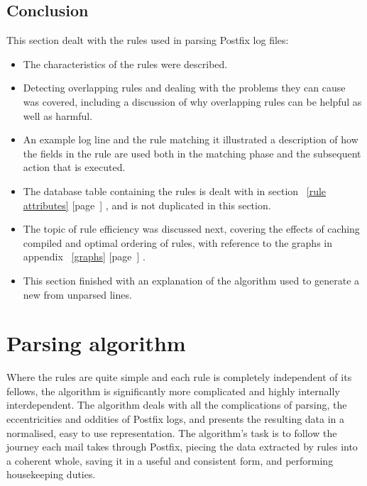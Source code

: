 \documentclass[a4paper,12pt,draft]{article}
\newcommand{\refwithpage}[1]{%
    \empty{}\ref{#1} [page~\pageref{#1}]%
}
\begin{document}
\subsection{Conclusion}

This section dealt with the rules used in parsing Postfix log files:

\begin{itemize}

    \item The characteristics of the rules were described.

    \item Detecting overlapping rules and dealing with the problems they
        can cause was covered, including a discussion of why overlapping
        rules can be helpful as well as harmful.

    \item An example log line and the rule matching it illustrated a
        description of how the fields in the rule are used both in the
        matching phase and the subsequent action that is executed.

    \item The database table containing the rules is dealt with in
        section~\refwithpage{rule attributes}, and is not duplicated in
        this section.

    \item The topic of rule efficiency was discussed next, covering the
        effects of caching compiled \regexes{} and optimal ordering of
        rules, with reference to the graphs in
        appendix~\refwithpage{graphs}.

    \item This section finished with an explanation of the algorithm used
        to generate a new \regex{} from unparsed lines.

\end{itemize}

\section{Parsing algorithm}

\label{parsing-algorithm}

Where the rules are quite simple and each rule is completely independent of
its fellows, the algorithm is significantly more complicated and highly
internally interdependent.  The algorithm deals with all the complications
of parsing, the eccentricities and oddities of Postfix logs, and presents
the resulting data in a normalised, easy to use representation.  The
algorithm's task is to follow the journey each mail takes through Postfix,
piecing the data extracted by rules into a coherent whole, saving it in a
useful and consistent form, and performing housekeeping duties.
\end{document}
